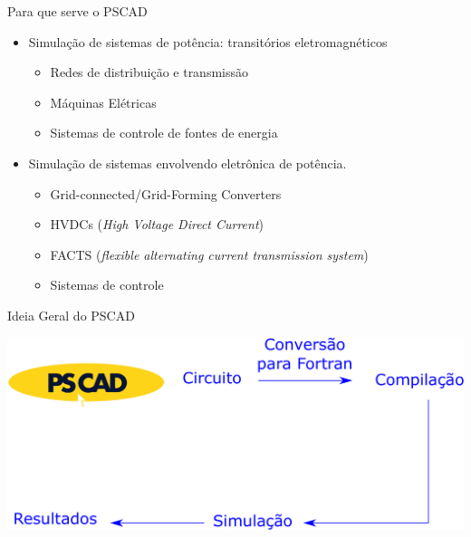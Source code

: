 \begin{frame}{Para que serve o PSCAD}
\centering

\begin{itemize}
\item Simulação de sistemas de potência: transitórios eletromagnéticos

\begin{itemize}
\item Redes de distribuição e transmissão
\item Máquinas Elétricas
\item Sistemas de controle de fontes de energia
\end{itemize}

\vspace*{1cm}

\item Simulação de sistemas envolvendo eletrônica de potência.

\begin{itemize}
\item Grid-connected/Grid-Forming Converters
\item HVDCs ({\it High Voltage Direct Current})
\item FACTS ({\it flexible alternating current transmission system})
\item Sistemas de controle
\end{itemize}

\end{itemize}

\end{frame}





\begin{frame}{Ideia Geral do PSCAD}
\centering


\includegraphics[width=0.95\linewidth]{./figuras/geral/fluxo}

\end{frame}
